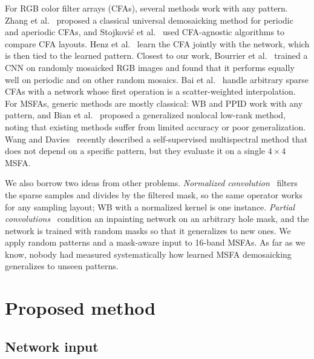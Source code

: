 \documentclass{article}
\begin{document}
For RGB color filter arrays (CFAs), several methods work with any pattern.
Zhang et al.~\cite{zhang2016} proposed a classical universal demosaicking
method for periodic and aperiodic CFAs, and Stojkovi\'c et
al.~\cite{stojkovic2019} used CFA-agnostic algorithms to compare CFA
layouts. Henz et al.~\cite{henz2018} learn the CFA jointly with the network,
which is then tied to the learned pattern. Closest to our work, Bourrier et
al.~\cite{bourrier2022} trained a CNN on randomly mosaicked RGB images and
found that it performs equally well on periodic and on other random mosaics.
Bai et al.~\cite{bai2024} handle arbitrary sparse CFAs with a network whose
first operation is a scatter-weighted interpolation. For MSFAs, generic
methods are mostly classical: WB and PPID work with any pattern, and Bian et
al.~\cite{bian2021} proposed a generalized nonlocal low-rank method, noting
that existing methods suffer from limited accuracy or poor generalization.
Wang and Davies~\cite{wang2026} recently described a self-supervised
multispectral method that does not depend on a specific pattern, but they
evaluate it on a single $4\times4$ MSFA.

We also borrow two ideas from other problems.
\emph{Normalized convolution}~\cite{knutsson1993} filters the sparse samples
and divides by the filtered mask, so the same operator works for any
sampling layout; WB with a normalized kernel is one instance. \emph{Partial
convolutions}~\cite{liu2018} condition an inpainting network on an arbitrary
hole mask, and the network is trained with random masks so that it
generalizes to new ones. We apply random patterns and a mask-aware input to
16-band MSFAs. As far as we know, nobody had measured systematically how
learned MSFA demosaicking generalizes to unseen patterns.

\section{Proposed method}
\label{sec:method}

\subsection{Network input}
\end{document}
